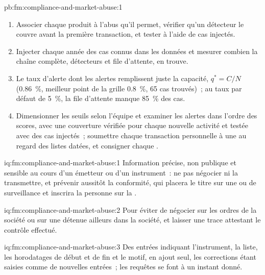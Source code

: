\begin{solution}{pb:fm:compliance-and-market-abuse:1}
\begin{enumerate}
\item Associer chaque produit à l'abus qu'il permet, vérifier qu'un détecteur le couvre avant la première transaction, et tester à l'aide de cas injectés.
\item Injecter chaque année des cas connus dans les données et mesurer combien la chaîne complète, détecteurs et file d'attente, en trouve.
\item Le taux d'alerte dont les alertes remplissent juste la capacité, $q^*=C/N$ (0.86~\%, meilleur point de la grille 0.8~\%, 65 cas trouvés)~; au taux par défaut de 5~\%, la file d'attente manque
85~\% des cas.
\item Dimensionner les seuils selon l'équipe et examiner les alertes dans l'ordre des scores, avec une couverture vérifiée pour chaque nouvelle activité et testée avec des cas injectés~;
soumettre chaque transaction personnelle à une  au regard des listes datées, et consigner chaque .
\end{enumerate}
\end{solution}

\begin{solution}{iq:fm:compliance-and-market-abuse:1}
Information précise, non publique et sensible au cours d'un émetteur ou d'un instrument~: ne pas négocier ni la transmettre, et prévenir aussitôt la conformité, qui
placera le titre sur une  ou de surveillance et inscrira la personne sur la .
\end{solution}

\begin{solution}{iq:fm:compliance-and-market-abuse:2}
Pour éviter de négocier sur les ordres de la société ou sur une  détenue ailleurs dans la société, et laisser une trace attestant le contrôle effectué.
\end{solution}

\begin{solution}{iq:fm:compliance-and-market-abuse:3}
Des entrées indiquant l'instrument, la liste, les horodatages de début et de fin et le motif, en ajout seul, les corrections étant saisies comme de nouvelles entrées~; les requêtes se font à un instant donné.
\end{solution}

